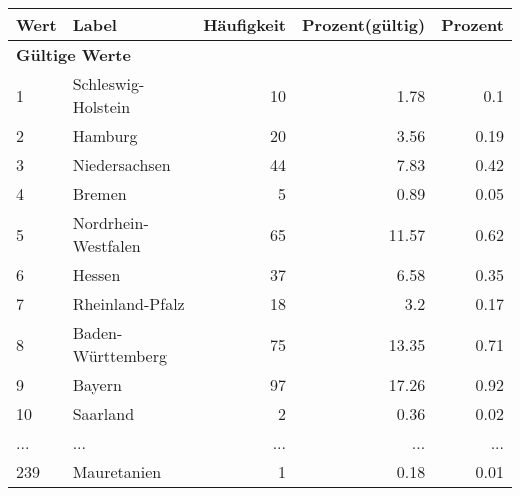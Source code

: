      \begin{longtable}{lXrrr}
     \toprule
     \textbf{Wert} & \textbf{Label} & \textbf{Häufigkeit} & \textbf{Prozent(gültig)} & \textbf{Prozent} \\
     \endhead
     \midrule
     \multicolumn{5}{l}{\textbf{Gültige Werte}}\\
        1 & \multicolumn{1}{X}{Schleswig-Holstein} & %
          \num{10} &
          \num[round-mode=places,round-precision=2]{1.78} &
          \num[round-mode=places,round-precision=2]{0.1} \\
        2 & \multicolumn{1}{X}{Hamburg} & %
          \num{20} &
          \num[round-mode=places,round-precision=2]{3.56} &
          \num[round-mode=places,round-precision=2]{0.19} \\
        3 & \multicolumn{1}{X}{Niedersachsen} & %
          \num{44} &
          \num[round-mode=places,round-precision=2]{7.83} &
          \num[round-mode=places,round-precision=2]{0.42} \\
        4 & \multicolumn{1}{X}{Bremen} & %
          \num{5} &
          \num[round-mode=places,round-precision=2]{0.89} &
          \num[round-mode=places,round-precision=2]{0.05} \\
        5 & \multicolumn{1}{X}{Nordrhein-Westfalen} & %
          \num{65} &
          \num[round-mode=places,round-precision=2]{11.57} &
          \num[round-mode=places,round-precision=2]{0.62} \\
        6 & \multicolumn{1}{X}{Hessen} & %
          \num{37} &
          \num[round-mode=places,round-precision=2]{6.58} &
          \num[round-mode=places,round-precision=2]{0.35} \\
        7 & \multicolumn{1}{X}{Rheinland-Pfalz} & %
          \num{18} &
          \num[round-mode=places,round-precision=2]{3.2} &
          \num[round-mode=places,round-precision=2]{0.17} \\
        8 & \multicolumn{1}{X}{Baden-Württemberg} & %
          \num{75} &
          \num[round-mode=places,round-precision=2]{13.35} &
          \num[round-mode=places,round-precision=2]{0.71} \\
        9 & \multicolumn{1}{X}{Bayern} & %
          \num{97} &
          \num[round-mode=places,round-precision=2]{17.26} &
          \num[round-mode=places,round-precision=2]{0.92} \\
        10 & \multicolumn{1}{X}{Saarland} & %
          \num{2} &
          \num[round-mode=places,round-precision=2]{0.36} &
          \num[round-mode=places,round-precision=2]{0.02} \\
       ... & ... & ... & ... & ... \\
        239 & \multicolumn{1}{X}{Mauretanien} & %
          \num{1} &
          \num[round-mode=places,round-precision=2]{0.18} &
          \num[round-mode=places,round-precision=2]{0.01} \\


\end{longtable}
